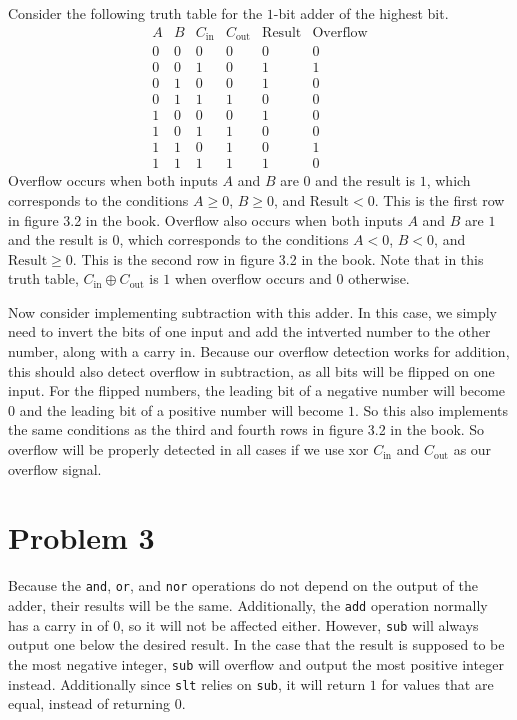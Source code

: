 \documentclass[12pt]{article}
\begin{document}
Consider the following truth table for the \(1\)-bit adder of the highest bit.
\[\begin{array}{c|c|c|c|c|c}
        A & B & C_\text{in} & C_\text{out} & \text{Result} & \text{Overflow}\\
        \hline
        0 & 0 & 0 & 0 & 0 & 0\\
        0 & 0 & 1 & 0 & 1 & 1\\
        0 & 1 & 0 & 0 & 1 & 0\\
        0 & 1 & 1 & 1 & 0 & 0\\
        1 & 0 & 0 & 0 & 1 & 0\\
        1 & 0 & 1 & 1 & 0 & 0\\
        1 & 1 & 0 & 1 & 0 & 1\\
        1 & 1 & 1 & 1 & 1 & 0
\end{array}\]
Overflow occurs when both inputs \(A\) and \(B\) are \(0\) and the result is \(1\), which corresponds to
the conditions \(A\geq 0\), \(B\geq 0\), and \(\text{Result}<0\). This is the first row in figure 3.2 in the book.
Overflow also occurs when both inputs \(A\) and \(B\) are \(1\) and the result is \(0\), which corresponds to
the conditions \(A<0\), \(B<0\), and \(\text{Result}\geq 0\). This is the second row in figure 3.2 in the book.
Note that in this truth table, \(C_\text{in}\oplus C_\text{out}\) is \(1\) when overflow occurs and \(0\) otherwise.

Now consider implementing subtraction with this adder. In this case, we simply need to invert the bits of one input and add the
intverted number to the other number, along with a carry in. Because our overflow detection works for addition, this should
also detect overflow in subtraction, as all bits will be flipped on one input. For the flipped numbers, the leading bit of a negative
number will become \(0\) and the leading bit of a positive number will become \(1\). So this also implements the same conditions as the
third and fourth rows in figure 3.2 in the book. So overflow will be properly detected in all cases if we use xor \(C_\text{in}\) and
\(C_\text{out}\) as our overflow signal.

\section*{Problem 3}

Because the \texttt{and}, \texttt{or}, and \texttt{nor} operations do not depend on the output of the adder, their results will be the same.
Additionally, the \texttt{add} operation normally has a carry in of \(0\), so it will not be affected either. However, \texttt{sub}
will always output one below the desired result. In the case that the result is supposed to be the most negative integer, \texttt{sub}
will overflow and output the most positive integer instead. Additionally since \texttt{slt} relies on \texttt{sub}, it will return \(1\) for values that are equal, instead of returning \(0\).
\end{document}
